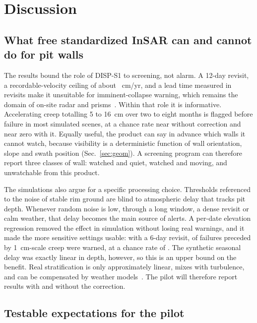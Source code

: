\documentclass[aps,prd,twocolumn,superscriptaddress,nofootinbib,floatfix,preprintnumbers,10pt]{revtex4-2}
\begin{document}
\section{Discussion}\label{sec:discussion}

\subsection{What free standardized InSAR can and cannot do for pit walls}

The results bound the role of DISP-S1 to screening, not alarm. A 12-day revisit, a recordable-velocity ceiling of about \AliasTwelve{}~cm/yr, and a lead time measured in revisits make it unsuitable for imminent-collapse warning, which remains the domain of on-site radar and prisms~\cite{Dick2015,Carla2017}. Within that role it is informative. Accelerating creep totalling 5 to 16~cm over two to eight months is flagged before failure in most simulated scenes, at a chance rate near \Chance{} without correction and near zero with it. Equally useful, the product can say in advance which walls it cannot watch, because visibility is a deterministic function of wall orientation, slope and swath position (Sec.~\ref{sec:geom}). A screening program can therefore report three classes of wall: watched and quiet, watched and moving, and unwatchable from this product.

The simulations also argue for a specific processing choice. Thresholds referenced to the noise of stable rim ground are blind to atmospheric delay that tracks pit depth. Whenever random noise is low, through a long window, a dense revisit or calm weather, that delay becomes the main source of alerts. A per-date elevation regression removed the effect in simulation without losing real warnings, and it made the more sensitive settings usable: with a 6-day revisit, \WSixCor{} of failures preceded by 1~cm-scale creep were warned, at a chance rate of \ChanceSixCor. The synthetic seasonal delay was exactly linear in depth, however, so this is an upper bound on the benefit. Real stratification is only approximately linear, mixes with turbulence, and can be compensated by weather models~\cite{Doin2009}. The pilot will therefore report results with and without the correction.

\subsection{Testable expectations for the pilot}
\end{document}
